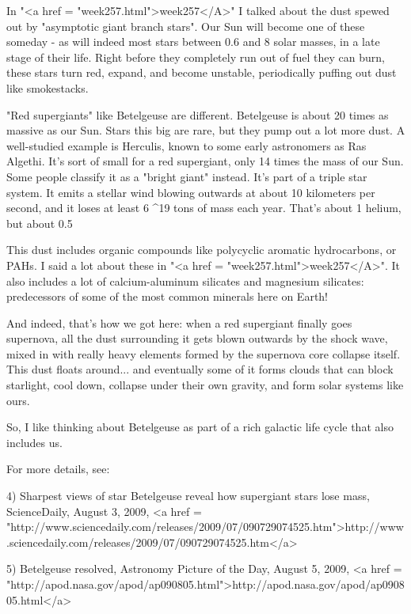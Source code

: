 In "<a href = "week257.html">week257</A>" I talked about the
dust spewed out by "asymptotic giant branch stars".  Our Sun
will become one of these someday - as will indeed most stars between
0.6 and 8 solar masses, in a late stage of their life.  Right before
they completely run out of fuel they can burn, these stars turn red,
expand, and become unstable, periodically puffing out dust like
smokestacks.

"Red supergiants" like Betelgeuse are different.
Betelgeuse is about 20 times as massive as our Sun.  Stars this big
are rare, but they pump out a lot more dust.  A well-studied example
is \alpha  Herculis, known to some early astronomers as Ras Algethi.
It's sort of small for a red supergiant, only 14 times the mass of our
Sun.  Some people classify it as a "bright giant" instead.
It's part of a triple star system.  It emits a stellar wind
blowing outwards at about 10 kilometers per second, and it loses at
least 6 ^{19} tons of mass each year.  That's about
1%
helium, but about 0.5%

This dust includes organic compounds like polycyclic aromatic
hydrocarbons, or PAHs.  I said a lot about these in "<a href =
"week257.html">week257</A>".  It also includes a lot of
calcium-aluminum silicates and magnesium silicates: predecessors of
some of the most common minerals here on Earth!  

And indeed, that's how we got here: when a red supergiant finally goes
supernova, all the dust surrounding it gets blown outwards by the
shock wave, mixed in with really heavy elements formed by the
supernova core collapse itself.  This dust floats around... and
eventually some of it forms clouds that can block starlight, cool
down, collapse under their own gravity, and form solar systems like
ours.

So, I like thinking about Betelgeuse as part of a rich galactic 
life cycle that also includes us.

For more details, see:

4) Sharpest views of star Betelgeuse reveal how supergiant stars lose
mass, ScienceDaily, August 3, 2009,
<a href = "http://www.sciencedaily.com/releases/2009/07/090729074525.htm">http://www.sciencedaily.com/releases/2009/07/090729074525.htm</a>

5) Betelgeuse resolved, Astronomy Picture of the Day, August 5, 2009,
<a href = "http://apod.nasa.gov/apod/ap090805.html">http://apod.nasa.gov/apod/ap090805.html</a>

